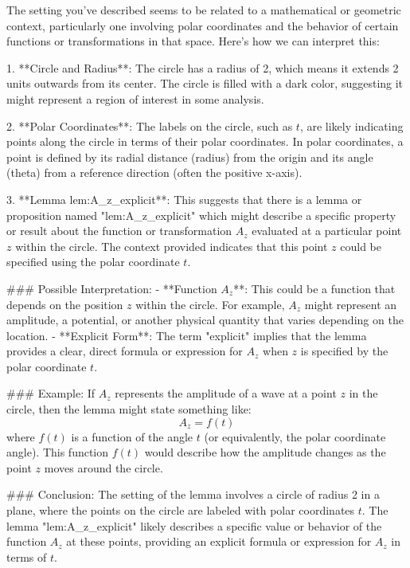 The setting you've described seems to be related to a mathematical or geometric context, particularly one involving polar coordinates and the behavior of certain functions or transformations in that space. Here's how we can interpret this:

1. **Circle and Radius**: The circle has a radius of 2, which means it extends 2 units outwards from its center. The circle is filled with a dark color, suggesting it might represent a region of interest in some analysis.

2. **Polar Coordinates**: The labels on the circle, such as \(t\), are likely indicating points along the circle in terms of their polar coordinates. In polar coordinates, a point is defined by its radial distance (radius) from the origin and its angle (theta) from a reference direction (often the positive x-axis).

3. **Lemma lem:A_z_explicit**: This suggests that there is a lemma or proposition named "lem:A_z_explicit" which might describe a specific property or result about the function or transformation \(A_z\) evaluated at a particular point \(z\) within the circle. The context provided indicates that this point \(z\) could be specified using the polar coordinate \(t\).

### Possible Interpretation:
- **Function \(A_z\)**: This could be a function that depends on the position \(z\) within the circle. For example, \(A_z\) might represent an amplitude, a potential, or another physical quantity that varies depending on the location.
- **Explicit Form**: The term "explicit" implies that the lemma provides a clear, direct formula or expression for \(A_z\) when \(z\) is specified by the polar coordinate \(t\).

### Example:
If \(A_z\) represents the amplitude of a wave at a point \(z\) in the circle, then the lemma might state something like:
\[ A_z = f(t) \]
where \(f(t)\) is a function of the angle \(t\) (or equivalently, the polar coordinate angle). This function \(f(t)\) would describe how the amplitude changes as the point \(z\) moves around the circle.

### Conclusion:
The setting of the lemma involves a circle of radius 2 in a plane, where the points on the circle are labeled with polar coordinates \(t\). The lemma "lem:A_z_explicit" likely describes a specific value or behavior of the function \(A_z\) at these points, providing an explicit formula or expression for \(A_z\) in terms of \(t\).